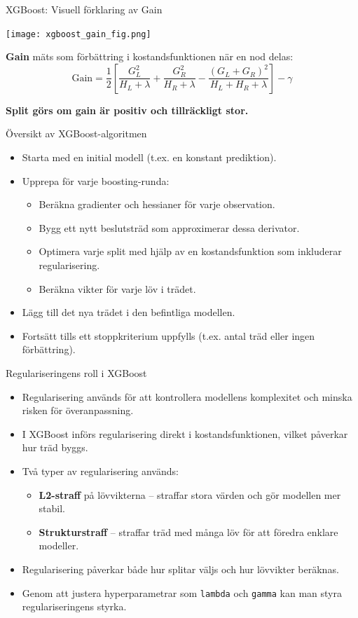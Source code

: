 \documentclass[10pt,english]{beamer}
\begin{document}
\begin{frame}{XGBoost: Visuell förklaring av Gain}
  \begin{center}
    \texttt{[image: xgboost\_gain\_fig.png]}
  \end{center}

  \vspace{0.3cm}
  \textbf{Gain} mäts som förbättring i kostandsfunktionen när en nod delas:
  \[
    \text{Gain} = \frac{1}{2} \left[ \frac{G_L^2}{H_L + \lambda} + \frac{G_R^2}{H_R + \lambda} - \frac{(G_L + G_R)^2}{H_L + H_R + \lambda} \right] - \gamma
  \]

  \textbf{Split görs om gain är positiv och tillräckligt stor.}
\end{frame}

\begin{frame}{Översikt av XGBoost-algoritmen}
  \begin{itemize}
    \item Starta med en initial modell (t.ex. en konstant prediktion).
    \item Upprepa för varje boosting-runda:
    \begin{itemize}
      \item Beräkna gradienter och hessianer för varje observation.
      \item Bygg ett nytt beslutsträd som approximerar dessa derivator.
      \item Optimera varje split med hjälp av en kostandsfunktion som inkluderar regularisering.
      \item Beräkna vikter för varje löv i trädet.
    \end{itemize}
    \item Lägg till det nya trädet i den befintliga modellen.
    \item Fortsätt tills ett stoppkriterium uppfylls (t.ex. antal träd eller ingen förbättring).
  \end{itemize}
\end{frame}

\begin{frame}{Regulariseringens roll i XGBoost}
  \begin{itemize}
    \item Regularisering används för att kontrollera modellens komplexitet och minska risken för överanpassning.
    \item I XGBoost införs regularisering direkt i kostandsfunktionen, vilket påverkar hur träd byggs.
    \item Två typer av regularisering används:
    \begin{itemize}
      \item \textbf{L2-straff} på lövvikterna – straffar stora värden och gör modellen mer stabil.
      \item \textbf{Strukturstraff} – straffar träd med många löv för att föredra enklare modeller.
    \end{itemize}
    \item Regularisering påverkar både hur splitar väljs och hur lövvikter beräknas.
    \item Genom att justera hyperparametrar som \texttt{lambda} och \texttt{gamma} kan man styra regulariseringens styrka.
  \end{itemize}
\end{frame}
\end{document}
